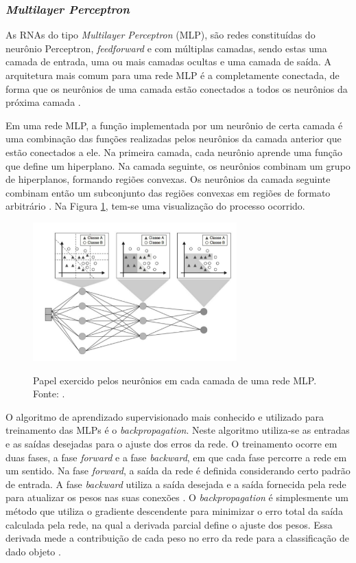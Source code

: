 \subsubsection{\emph{Multilayer Perceptron}}
\label{subsubsec:mlp}

As RNAs do tipo \emph{Multilayer Perceptron} (MLP), são redes constituídas do neurônio Perceptron, \emph{feedforward} e com múltiplas camadas, sendo estas uma camada de entrada, uma ou mais camadas ocultas e uma camada de saída. A arquitetura mais comum para uma rede MLP é a completamente conectada, de forma que os neurônios de uma camada estão conectados a todos os neurônios da próxima camada \cite{faceli}.

Em uma rede MLP, a função implementada por um neurônio de certa camada é uma combinação das funções realizadas pelos neurônios da camada anterior que estão conectados a ele. Na primeira camada, cada neurônio aprende uma função que define um hiperplano. Na camada seguinte, os neurônios combinam um grupo de hiperplanos, formando regiões convexas. Os neurônios da camada seguinte combinam então um subconjunto das regiões convexas em regiões de formato arbitrário \cite{faceli}. Na Figura \ref{fig:aprendizado-mlp}, tem-se uma visualização do processo ocorrido.


\begin{figure}[h!]
\centering
\caption{Papel exercido pelos neurônios em cada camada de uma rede MLP. Fonte: \cite{faceli}.}
\includegraphics[width=0.7\textwidth]{imgs/aprendizado-mlp}
\label{fig:aprendizado-mlp}
\end{figure}

O algoritmo de aprendizado supervisionado mais conhecido e utilizado para treinamento das MLPs é o \emph{backpropagation}. Neste algoritmo utiliza-se as entradas e as saídas desejadas para o ajuste dos erros da rede. O treinamento ocorre em duas fases, a fase \emph{forward} e a fase \emph{backward}, em que cada fase percorre a rede em um sentido. Na fase \emph{forward}, a saída da rede é definida considerando certo padrão de entrada. A fase \emph{backward} utiliza a saída desejada e a saída fornecida pela rede para atualizar os pesos nas suas conexões \cite{braga}. O \emph{backpropagation} é simplesmente um método que utiliza o gradiente descendente para minimizar o erro total da saída calculada pela rede, na qual a derivada parcial define o ajuste dos pesos. Essa derivada mede a contribuição de cada peso no erro da rede para a classificação de dado objeto \cite{fausett, faceli}.

